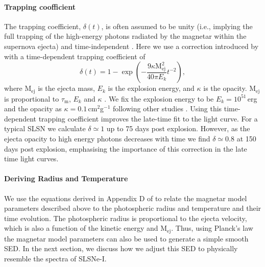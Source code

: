 \paragraph{Trapping coofficient}
The trapping coefficient, $\delta(t)$, is often assumed to be unity
(i.e., implying the full trapping of the high-energy photons radiated
by the magnetar within the supernova ejecta) and time-independent
\citep{2013ApJ...770..128I,2015MNRAS.449.1215P,2015MNRAS.452.3869N}.
Here we use a correction introduced by \cite{2015ApJ...799..107W} with
a time-dependent trapping coefficient of
\begin{equation}
\delta(t) = 1 - \exp\left({-\frac{9\kappa \mathrm{M}_{\mathrm{ej}}^{2}}{40\pi  E_k} t^{-2}} \right),
\label{Eq:Wang}
\end{equation}
where $\mathrm{M}_{\mathrm{ej}}$ is the ejecta mass, $E_k$ is the
explosion energy, and $\kappa$ is the opacity.
$\mathrm{M}_{\mathrm{ej}}$ is proportional to $\tau_\mathrm{m}$, $E_k$
and $\kappa$ \citep{2013ApJ...770..128I}. We fix the explosion energy
to be $E_k = 10^{51}$\,erg and the opacity as $\kappa =
0.1$\,cm$^2$g$^{-1}$ following other studies
\citep[e.g.][]{2013ApJ...770..128I,2014ApJ...796...87I,2015MNRAS.452.3869N,2015MNRAS.449.1215P}.
Using this time-dependent trapping coefficient improves the late-time
fit to the light curve.  For a typical SLSN we calculate $\delta
\simeq 1$ up to 75 days post explosion. However, as the ejecta opacity
to high energy photons decreases with time we find $\delta \simeq 0.8$
at 150 days post explosion, emphasising the importance of this
correction in the late time light curves.

\paragraph{Deriving Radius and Temperature}
We use the equations derived in Appendix D of
\cite{2013ApJ...770..128I} to relate the magnetar model parameters
described above to the photospheric radius and temperature and their
time evolution. The photospheric radius is proportional to the ejecta
velocity, which is also a function of the kinetic energy and
M$_{\mathrm{ej}}$. Thus, using Planck's law the magnetar
model parameters can also be used to generate a simple smooth SED. In
the next section, we discuss how we adjust this SED to physically
resemble the spectra of SLSNe-I.

